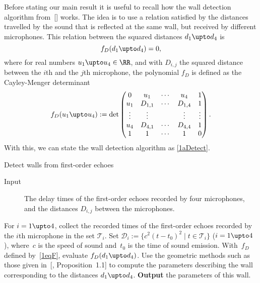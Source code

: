 \documentclass[reqno]{amsart}
\begin{document}
Before stating our main result it is useful to recall how the wall detection
algorithm from~[] works. The idea is to
use a relation satisfied by the distances travelled by the sound that
is reflected at the same wall, but received by different
microphones. This relation between the squared distances
$d_1 \upto d_4$ is
\begin{equation} \label{1eqRel}%
  f_D(d_1 \upto d_4) = 0,
\end{equation}
where for real numbers $u_1 \upto u_4 \in \RR$, and with $D_{i,j}$ the
squared distance between the $i$th and the $j$th microphone, the
polynomial $f_D$ is defined as the Cayley-Menger determinant
\begin{equation} \label{1eqF}%
  f_D(u_1 \upto u_4) := \det
  \begin{pmatrix}
    0 & u_1 & \cdots & u_4 & 1 \\
    u_1 & D_{1,1} & \cdots & D_{1,4} & 1 \\
    \vdots & \vdots & & \vdots & \vdots \\
    u_4 & D_{4,1} & \cdots & D_{4,4} & 1 \\
    1 & 1 & \cdots & 1 & 0
  \end{pmatrix}.
\end{equation}
With this, we can state the wall detection algorithm as
\cref{1aDetect}.

\begin{algorithm}%
  \caption{Detect walls from first-order echoes} \label{1aDetect}
  \mbox{}%
  \begin{description}
  \item[Input] The delay times of the first-order echoes recorded by
    four microphones, and the distances $D_{i,j}$ between the
    microphones.
  \end{description}
  \begin{algorithmic}[1]
    \STATE \label{1aDetect1} For $i = 1 \upto 4$, collect the recorded
    times of the first-order echoes recorded by the $i$th microphone
    in the set $\mathcal T_i$.%
    \STATE \label{1aDetect2} Set
    $\mathcal D_i := \{c^2 (t - t_0)^2 \mid t \in \mathcal T_i\}$
    ($i = 1 \upto 4$), where~$c$ is the speed of sound and~$t_0$ is
    the time of sound emission.%
     \label{1aDetect3}%
    \STATE \label{1aDetect4} With~$f_D$ defined by~\cref{1eqF},
    evaluate $f_D(d_1 \upto d_4)$.%
    \STATE \label{1aDetect6} Use the geometric methods such as those
    given in~[, Proposition~1.1] to
    compute the parameters describing the wall corresponding to the
    distances $d_1 \upto d_4$.%
    \STATE \label{1aDetect7} {\bf Output} the parameters of this
    wall.%
    \ENDIF%
    \ENDFOR%
  \end{algorithmic}
\end{algorithm}
\end{document}
